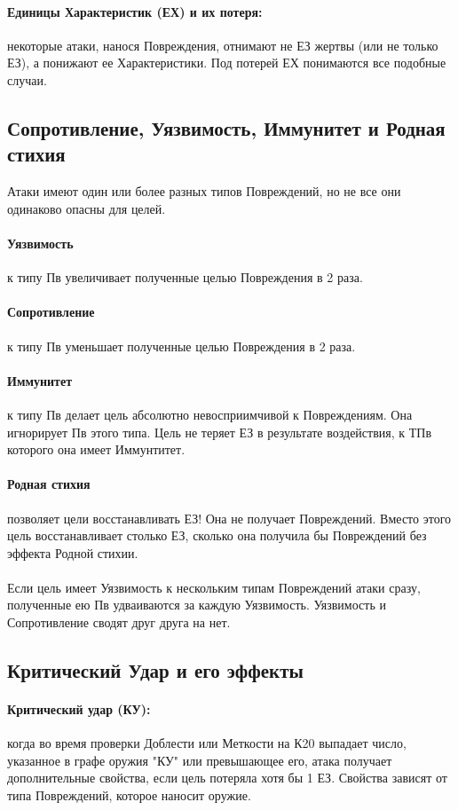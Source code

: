 \paragraph{Единицы Характеристик (ЕХ) и их потеря:} некоторые атаки, нанося Повреждения, отнимают не ЕЗ жертвы (или не только ЕЗ), а понижают ее Характеристики. Под потерей ЕХ понимаются все подобные случаи. 

\subsection{Сопротивление, Уязвимость, Иммунитет и Родная стихия}
Атаки имеют один или более разных типов Повреждений, но не все они одинаково опасны для целей.
\paragraph{Уязвимость} к типу Пв увеличивает полученные целью Повреждения в 2 раза. 
\paragraph{Сопротивление} к типу Пв уменьшает полученные целью Повреждения в 2 раза. 
\paragraph{Иммунитет} к типу Пв делает цель абсолютно невосприимчивой к Повреждениям. Она игнорирует Пв этого типа. Цель не теряет ЕЗ в результате воздействия, к ТПв которого она имеет Иммунтитет.
\paragraph{Родная стихия} позволяет цели восстанавливать ЕЗ! Она не получает Повреждений. Вместо этого цель восстанавливает столько ЕЗ, сколько она получила бы Повреждений без эффекта Родной стихии.
\paragraph{}Если цель имеет Уязвимость к нескольким типам Повреждений атаки сразу, полученные ею Пв удваиваются за каждую Уязвимость. 
\newline Уязвимость и Сопротивление сводят друг друга на нет. 

\subsection{Критический Удар и его эффекты}
\paragraph{Критический удар (КУ):} когда во время проверки Доблести или Меткости на К20 выпадает число, указанное в графе оружия "КУ" или превышающее его, атака получает дополнительные свойства, если цель потеряла хотя бы 1 ЕЗ. Свойства зависят от типа Повреждений, которое наносит оружие.
